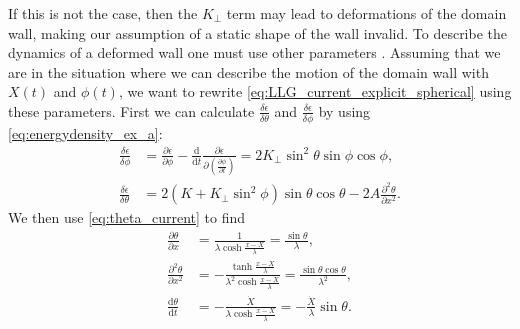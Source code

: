 \documentclass[12pt, a4paper]{article}		%
\numberwithin{equation}{section}
\begin{document}
If this is not the case, then the $K_{\perp}$ term may lead to deformations of the domain wall, making our assumption of a static shape of the wall invalid. To describe the dynamics of a deformed wall one must use other parameters \cite{TataraKohnoShibata2008}. Assuming that we are in the situation where we can describe the motion of the domain wall with $X(t)$ and $\phi(t)$, we want to rewrite \eqref{eq:LLG_current_explicit_spherical} using these parameters. First we can calculate $\frac{\delta \epsilon}{\delta \theta}$ and $\frac{\delta \epsilon}{\delta \phi}$ by using \eqref{eq:energydensity_ex_a}:
\begin{align}
\frac{\delta \epsilon}{\delta \phi} &= \frac{\partial \epsilon}{\partial \phi} - \frac{\textrm{d}}{\textrm{d} t} \frac{\partial \epsilon}{\partial (\frac{\partial \phi}{\partial t})} = 2K_{\perp}\sin^2 \theta\sin\phi\cos\phi, \\
\frac{\delta \epsilon}{\delta \theta} &= 2(K+K_{\perp} \sin^2 \phi)\sin\theta\cos\theta - 2A\frac{\partial^2 \theta}{\partial x^2}.
\end{align}
We then use \eqref{eq:theta_current}  to find
\begin{align}
\frac{\partial \theta}{\partial x} &=  \frac{1}{\lambda\cosh\frac{x-X}{\lambda}} = \frac{\sin\theta}{\lambda}, \\
\frac{\partial^2 \theta}{\partial x^2} &=  -\frac{\tanh\frac{x-X}{\lambda}}{\lambda^2\cosh\frac{x-X}{\lambda}} = \frac{\sin\theta\cos\theta}{\lambda^2}, \\
\frac{\textrm{d} \theta}{\textrm{d} t} &= -\frac{\dot{X}}{\lambda\cosh\frac{x-X}{\lambda}} = -\frac{\dot{X}}{\lambda}\sin\theta.
\end{align}
\end{document}
